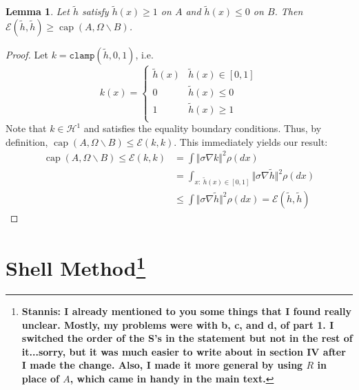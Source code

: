 \documentclass[nofootinbib,english, aip, jcp, priprint, graphicx,floatfix]{revtex4-1}
\newtheorem{lemma}{Lemma}
\theoremstyle{plain}
\theoremstyle{definition}
\theoremstyle{plain}
\newcommand{\capac}[2]{\ensuremath{\operatorname{cap}}(#1,#2)}
\begin{document}
\begin{lemma} \label{lem:inequalityboundaryvar} Let $\tilde h$ satisfy $\tilde h(x)\geq 1$ on $A$ and $\tilde h(x)\leq 0$ on $B$.  Then $\mathscr{E}(\tilde h,\tilde h) \geq \capac{A}{\Omega \backslash B}$.
\end{lemma}
\begin{proof}
Let $k=\mathtt{clamp}(\tilde h,0,1)$, i.e.
\[
k(x)=
\begin{cases}
\tilde h(x) & \tilde h(x)\in[0,1] \\
0 & \tilde h(x)\leq 0 \\
1 & \tilde h(x)\geq 1 \\
\end{cases}
\]  
Note that $k\in \mathcal{H}^1$ and satisfies the equality boundary conditions.  Thus, by definition, $\capac{A}{\Omega \backslash B} \leq \mathscr{E}(k,k)$.  This immediately yields our result:
\begin{align*}
\capac{A}{\Omega \backslash B} \leq \mathscr{E}(k,k) &= \int \Vert \sigma \nabla k \Vert^2 \rho(dx) \\
    &=\int_{x:\ \tilde h(x)\in[0,1]} \Vert \sigma \nabla \tilde h \Vert^2 \rho(dx) \\
    &\leq \int \Vert \sigma \nabla \tilde h \Vert^2 \rho(dx) = \mathscr{E}(\tilde h,\tilde h)
\end{align*}


\end{proof}

%
%
%
%
%
%
%
%
%






\section{Shell Method\footnote{\bf Stannis: I already mentioned to you some things that I found really unclear. Mostly, my problems were with b, c, and d, of part 1. I switched the order of the S's in the statement but not in the rest of it...sorry, but it was much easier to write about in section IV after I made the change. Also, I made it more general by using $R$ in place of $A$, which came in handy in the main text.} }
\label{sec:shell_method}
\end{document}
